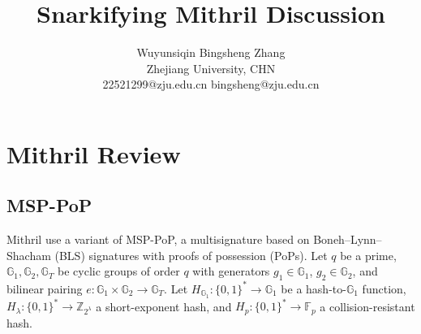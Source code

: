 \documentclass{article}
\title{Snarkifying Mithril Discussion}
\author{Wuyunsiqin \quad \quad Bingsheng Zhang \\ 
Zhejiang University, CHN \\
22521299@zju.edu.cn \quad bingsheng@zju.edu.cn}
\begin{document}
\maketitle


\section{Mithril Review}
\subsection{MSP-PoP}

Mithril use a variant of MSP-PoP, a multisignature based on Boneh–Lynn–Shacham (BLS) signatures with proofs of possession (PoPs). Let $q$ be a prime, $\mathbb{G}_1,\mathbb{G}_2,\mathbb{G}_T$ be cyclic groups of order $q$ with generators $g_1\in\mathbb{G}_1$, $g_2\in\mathbb{G}_2$, and bilinear pairing $e:\mathbb{G}_1\times\mathbb{G}_2\to\mathbb{G}_T$. Let $H_{\mathbb{G}_1}:\{0,1\}^\ast\to\mathbb{G}_1$ be a hash-to-$\mathbb{G}_1$ function, $H_\lambda:\{0,1\}^\ast\to\mathbb{Z}_{2^\lambda}$ a short-exponent hash, and $H_p:\{0,1\}^\ast\to\mathbb{F}_p$ a collision-resistant hash.
\end{document}
